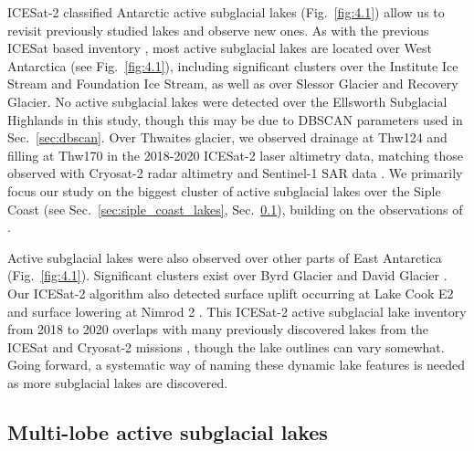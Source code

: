 ICESat-2 classified Antarctic active subglacial lakes (Fig.~\ref{fig:4.1}) allow us to revisit previously studied lakes and observe new ones.
As with the previous ICESat based inventory \citep{Smithinventoryactivesubglacial2009}, most active subglacial lakes are located over West Antarctica (see Fig.~\ref{fig:4.1}), including significant clusters over the Institute Ice Stream and Foundation Ice Stream, as well as over Slessor Glacier and Recovery Glacier.
No active subglacial lakes were detected over the Ellsworth Subglacial Highlands \citep[c.f.][]{NapoleoniSubglaciallakeshydrology2020} in this study, though this may be due to DBSCAN parameters used in Sec.~\ref{sec:dbscan}.
Over Thwaites glacier, we observed drainage at Thw124 and filling at Thw170 in the 2018-2020 ICESat-2 laser altimetry data, matching those observed with Cryosat-2 radar altimetry \citep{SmithConnectedsubglaciallake2017,MalczykRepeatSubglacialLake2020} and Sentinel-1 SAR data \citep{HoffmanBriefCommunicationHeterogenous2020}.
We primarily focus our study on the biggest cluster of active subglacial lakes over the Siple Coast (see Sec.~\ref{sec:siple_coast_lakes}, Sec.~\ref{sec:multi-lobe}), building on the observations of \citet{SiegfriedEpisodicicevelocity2016}.

Active subglacial lakes were also observed over other parts of East Antarctica (Fig.~\ref{fig:4.1}).
Significant clusters exist over Byrd Glacier \citep[c.f.][]{WrightSubglacialhydrologicalconnectivity2014} and David Glacier \citep[c.f.][]{LindzeyAerogeophysicalcharacterizationactive2020}.
Our ICESat-2 algorithm also detected surface uplift occurring at Lake Cook E2 \citep[c.f.][]{LiRadarSoundingConfirms2020} and surface lowering at Nimrod 2 \citep[c.f.][]{Smithinventoryactivesubglacial2009}.
This ICESat-2 active subglacial lake inventory from 2018 to 2020 overlaps with many previously discovered lakes from the ICESat and Cryosat-2 missions \citep[see][]{Smithinventoryactivesubglacial2009,SiegfriedThirteenyearssubglacial2018}, though the lake outlines can vary somewhat.
Going forward, a systematic way of naming these dynamic lake features is needed as more subglacial lakes are discovered.

\subsection{Multi-lobe active subglacial lakes} \label{sec:multi-lobe}

